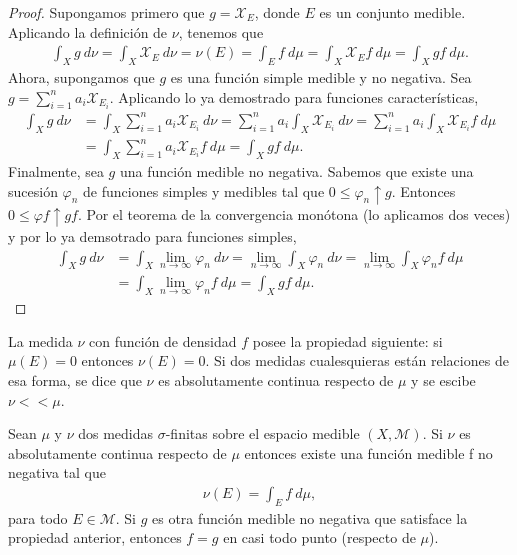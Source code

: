 \begin{proof}
Supongamos primero que $g = \mathcal{X}_E$, donde $E$ es un conjunto medible. Aplicando la definición de $\nu$, tenemos que
\begin{align*}
    \int_{X}{g \ d\nu} = \int_{X}{\mathcal{X}_E \ d\nu} = \nu(E)  = \int_{E}{f \ d\mu} = \int_{X}{\mathcal{X}_Ef \ d\mu} = \int_{X}{gf \ d\mu}.
\end{align*}
Ahora, supongamos que $g$ es una función simple medible y no negativa. Sea $g = \sum_{i=1}^{n}{a_i \mathcal{X}_{E_i}}$. Aplicando lo ya demostrado para funciones características,
\begin{align*}
    \int_{X}{g \ d\nu} &= \int_{X}{\sum_{i=1}^{n}{a_i \mathcal{X}_{E_i}} \ d\nu} = \sum_{i=1}^{n}{a_i \int_{X}{\mathcal{X}_{E_i}} \ d\nu} = \sum_{i=1}^{n}{a_i \int_{X}{\mathcal{X}_{E_i}f} \ d\mu}\\
    &= \int_{X}{\sum_{i=1}^{n}{a_i\mathcal{X}_{E_i}f} \ d\mu} = \int_{X}{gf \ d\mu}.
\end{align*}
Finalmente, sea $g$ una función medible no negativa. Sabemos que existe una sucesión $\varphi_n$ de funciones simples y medibles tal que $0 \leq \varphi_n \uparrow g$. Entonces $0 \leq \varphi f \uparrow g f$. Por el teorema de la convergencia monótona (lo aplicamos dos veces) y por lo ya demsotrado para funciones simples,
\begin{align*}
    \int_{X}{g \ d\nu} &= \int_{X}{\lim_{n \to \infty}{\varphi_n} \ d\nu} = \lim_{n \to \infty}{\int_{X}{\varphi_n} \ d\nu} = \lim_{n \to \infty}{\int_{X}{\varphi_n f \ d\mu}}\\
    &= \int_{X}{\lim_{n \to \infty}{\varphi_nf} \ d\mu} = \int_{X}{gf \ d\mu}.
\end{align*}
\end{proof}

\begin{obs}
La medida $\nu$ con función de densidad $f$ posee la propiedad siguiente: si $\mu(E) = 0$ entonces $\nu(E) = 0$. Si dos medidas cualesquieras están relaciones de esa forma, se dice que $\nu$ es absolutamente continua respecto de $\mu$ y se escibe $\nu << \mu$.
\end{obs}

\begin{teo}
Sean $\mu$ y $\nu$ dos medidas $\sigma$-finitas sobre el espacio medible $(X, \mathcal{M})$. Si $\nu$ es absolutamente continua respecto de $\mu$ entonces existe una función medible f no negativa tal que
\begin{align*}
    \nu(E) = \int_{E}{f \ d\mu},
\end{align*}
para todo $E \in \mathcal{M}$. Si $g$ es otra función medible no negativa que satisface la propiedad anterior, entonces $f = g$ en casi todo punto (respecto de $\mu$).
\end{teo}

